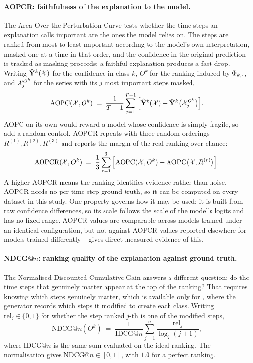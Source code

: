 \paragraph{AOPCR: faithfulness of the explanation to the model.}
The Area Over the Perturbation Curve \citep{samek2017aopc} tests whether the time steps an
explanation calls important are the ones the model relies on. The steps are ranked from most to least
important according to the model's own interpretation, masked one at a time in that order, and the
confidence in the original prediction is tracked as masking proceeds; a faithful explanation produces
a fast drop. Writing $\hat{\mathbf{Y}}^{k}(\mathcal{X})$ for the confidence in class $k$, $O^k$ for the ranking
induced by $\Phi_{k,\cdot}$, and $\mathcal{X}^{O^k}_{j}$ for the series with its $j$ most important steps
masked,
\begin{equation}
  \text{AOPC}(\mathcal{X}, O^k) \;=\; \frac{1}{T-1}\sum_{j=1}^{T-1}
  \Big[\hat{\mathbf{Y}}^{k}(\mathcal{X}) - \hat{\mathbf{Y}}^{k}\big(\mathcal{X}^{O^k}_{j}\big)\Big] .
  \label{eq:aopc}
\end{equation}
AOPC on its own would reward a model whose confidence is simply fragile, so \citet{early2024millet}
add a random control. AOPCR repeats  with three random orderings
$R^{(1)}, R^{(2)}, R^{(3)}$ and reports the margin of the real ranking over chance:
\begin{equation}
  \text{AOPCR}(\mathcal{X}, O^k) \;=\; \frac{1}{3}\sum_{r=1}^{3}
  \Big[\text{AOPC}(\mathcal{X}, O^k) - \text{AOPC}\big(\mathcal{X}, R^{(r)}\big)\Big] .
  \label{eq:aopcr}
\end{equation}
A higher AOPCR means the ranking identifies evidence rather than noise. AOPCR needs no
per-time-step ground truth, so it can be computed on every dataset in this study. One property
governs how it may be used: it is built from raw confidence differences, so its scale follows the
scale of the model's logits and has no fixed range. AOPCR values are comparable across models trained
under an identical configuration, but not against AOPCR values reported elsewhere for models trained
differently --  gives direct measured evidence of this.

\paragraph{NDCG@$n$: ranking quality of the explanation against ground truth.}
The Normalised Discounted Cumulative Gain \citep{jarvelin2002ndcg} answers a different question: do
the time steps that genuinely matter appear at the top of the ranking? That requires knowing which
steps genuinely matter, which is available only for \webtraffic{}, where the generator records which
steps it modified to create each class. Writing $\text{rel}_j \in \{0,1\}$ for whether the step
ranked $j$-th is one of the modified steps,
\begin{equation}
  \text{NDCG@}n(O^k) \;=\; \frac{1}{\text{IDCG@}n}\sum_{j=1}^{n}
  \frac{\text{rel}_j}{\log_2(j+1)} ,
  \label{eq:ndcg}
\end{equation}
where $\text{IDCG@}n$ is the same sum evaluated on the ideal ranking. The normalisation gives
$\text{NDCG@}n \in [0,1]$, with $1.0$ for a perfect ranking.

